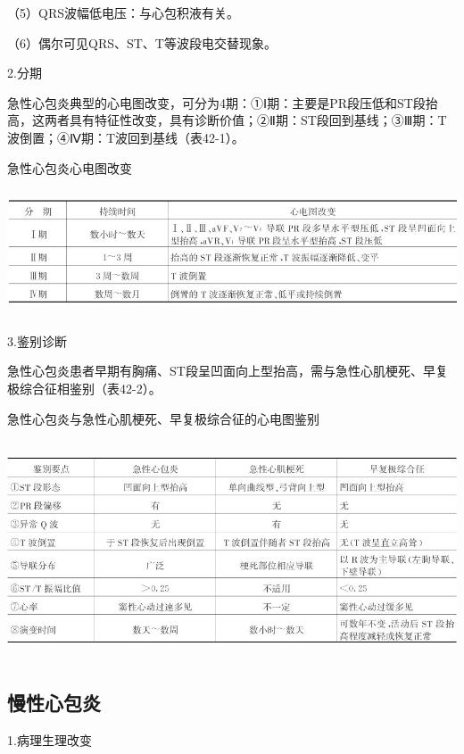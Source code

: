 （5）QRS波幅低电压：与心包积液有关。

（6）偶尔可见QRS、ST、T等波段电交替现象。

2.分期

急性心包炎典型的心电图改变，可分为4期：①Ⅰ期：主要是PR段压低和ST段抬高，这两者具有特征性改变，具有诊断价值；②Ⅱ期：ST段回到基线；③Ⅲ期：T波倒置；④Ⅳ期：T波回到基线（表42-1）。

\begin{table}[htbp]
\centering
\caption{急性心包炎心电图改变}
\label{tab42-1}
\includegraphics[width=6.20833in,height=1.47917in]{./images/Image00701.jpg}
\end{table}

3.鉴别诊断

急性心包炎患者早期有胸痛、ST段呈凹面向上型抬高，需与急性心肌梗死、早复极综合征相鉴别（表42-2）。

\begin{table}[htbp]
\centering
\caption{急性心包炎与急性心肌梗死、早复极综合征的心电图鉴别}
\label{tab42-2}
\includegraphics[width=6.20833in,height=2.5625in]{./images/Image00702.jpg}
\end{table}

\protect\hypertarget{text00050.htmlux5cux23subid612}{}{}

\subsection{慢性心包炎}

1.病理生理改变

